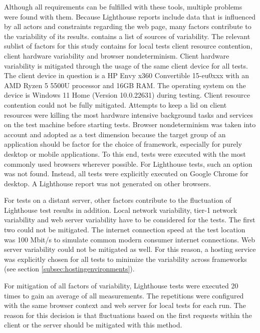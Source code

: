 \documentclass[a4paper, 10pt]{article}
\begin{document}
Although all requirements can be fulfilled with these tools, multiple problems were found with them.
Because Lighthouse reports include data that is influenced by all actors and constraints regarding the web page, many factors contribute to the variability of its results.
\cite{lighthouseVariability} contains a list of sources of variability.
The relevant sublist of factors for this study contains for local tests client resource contention, client hardware variability and browser nondeterminism.
Client hardware variability is mitigated through the usage of the same client device for all tests.
The client device in question is a HP Envy x360 Convertible 15-eu0xxx with an AMD Ryzen 5 5500U processor and 16GB RAM.
The operating system on the device is Windows 11 Home (Version 10.0.22631) during testing.
Client resource contention could not be fully mitigated.
Attempts to keep a lid on client resources were killing the most hardware intensive background tasks and services on the test machine before starting tests.
Browser nondeterminism was taken into account and adopted as a test dimension because the target group of an application should be factor for the choice of framework, especially for purely desktop or mobile applications.
To this end, tests were executed with the most commonly used browsers wherever possible.
For Lighthouse tests, such an option was not found.
Instead, all tests were explicitly executed on Google Chrome for desktop.
A Lighthouse report was not generated on other browsers.

For tests on a distant server, other factors contribute to the fluctuation of Lighthouse test results in addition.
Local network variability, tier-1 network variability and web server variability have to be considered for the tests.
The first two could not be mitigated.
The internet connection speed at the test location was 100 Mbit/s to simulate common modern consumer internet connections. %
Web server variability could not be mitigated as well.
For this reason, a hosting service was explicitly chosen for all tests to minimize the variability across frameworks (see section \ref{subsec:hostingenvironments}).

For mitigation of all factors of variability, Lighthouse tests were executed 20 times to gain an average of all measurements.
The repetitions were configured with the same browser context and web server for local tests for each run.
The reason for this decision is that fluctuations based on the first requests within the client or the server should be mitigated with this method.
\end{document}
